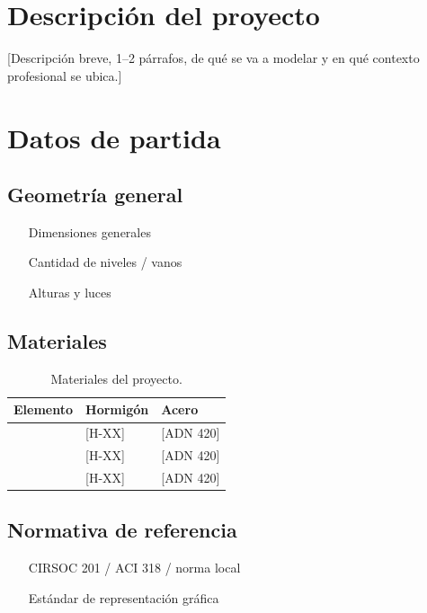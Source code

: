 \documentclass[11pt,a4paper]{article}
\begin{document}
\section{Descripción del proyecto}
[Descripción breve, 1--2 párrafos, de qué se va a modelar y en qué contexto profesional se ubica.]

\section{Datos de partida}
\subsection{Geometría general}
\begin{itemize}
    \item [Dimensiones generales]
    \item [Cantidad de niveles / vanos]
    \item [Alturas y luces]
\end{itemize}

\subsection{Materiales}
\begin{table}[H]
\centering
\begin{tabular}{lll}
\toprule
\textbf{Elemento} & \textbf{Hormigón} & \textbf{Acero} \\
\midrule
[Vigas]    & [H-XX] & [ADN 420] \\
[Columnas] & [H-XX] & [ADN 420] \\
[Losas]    & [H-XX] & [ADN 420] \\
\bottomrule
\end{tabular}
\caption{Materiales del proyecto.}
\end{table}

\subsection{Normativa de referencia}
\begin{itemize}
    \item [CIRSOC 201 / ACI 318 / norma local]
    \item [Estándar de representación gráfica]
\end{itemize}
\end{document}
